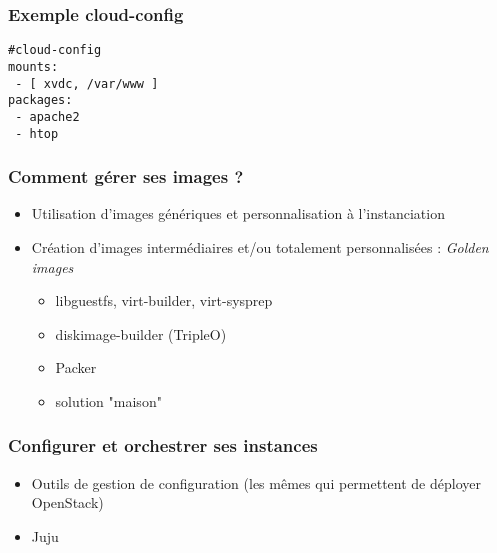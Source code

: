   \begin{frame}[containsverbatim]
    \frametitle{Exemple cloud-config}
\begin{verbatim}
#cloud-config
mounts:
 - [ xvdc, /var/www ]
packages:
 - apache2
 - htop
\end{verbatim}
  \end{frame}

  \begin{frame}
    \frametitle{Comment gérer ses images ?}
    \begin{itemize}
      \item Utilisation d'images génériques et personnalisation à l'instanciation
      \item Création d'images intermédiaires et/ou totalement personnalisées : \textit{Golden images}
      \begin{itemize}
        \item libguestfs, virt-builder, virt-sysprep
        \item diskimage-builder (TripleO)
        \item Packer
        \item solution "maison"
      \end{itemize}
    \end{itemize}
  \end{frame}

  \begin{frame}
    \frametitle{Configurer et orchestrer ses instances}
    \begin{itemize}
      \item Outils de gestion de configuration (les mêmes qui permettent de déployer OpenStack)
      \item Juju
    \end{itemize}
  \end{frame}
